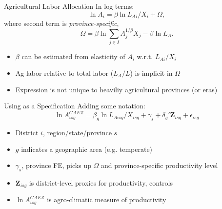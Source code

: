 \documentclass[10pt, xcolor=dvipsnames]{beamer}
\begin{document}
\begin{frame}{Agricultural Labor Allocation}
In log terms:
\begin{equation}
\ln A_{i} = \beta \ln L_{Ai}/X_i + \Omega, \label{EQ_est}
\end{equation}
where second term is \textit{province-specific},
\begin{equation}
   \Omega = \beta \ln \sum_{j\in I} A_{j}^{1/\beta}X_{j} - \beta \ln L_A.
\end{equation} 

\begin{itemize}
  \item $\beta$ can be estimated from elasticity of $A_i$ w.r.t. $L_{Ai}/X_i$
  \item Ag labor relative to total labor ($L_A/L$) is implicit in $\Omega$
  \item Expression is not unique to heaviliy agricultural provinces (or eras)
\end{itemize}

\hfill \hyperlink{extend}{}
\end{frame}

\begin{frame}{Using as a Specification}
Adding some notation:
\begin{equation}
\ln A^{GAEZ}_{isg} = \beta_g \ln L_{Aisg}/X_{isg} + \gamma_{s} + \delta_g' \mathbf{Z}_{isg} + \epsilon_{isg}
\end{equation}

\begin{itemize}
  \item District $i$, region/state/province $s$
  \item $g$ indicates a geographic area (e.g. temperate)
  \item $\gamma_{s}$, province FE, picks up $\Omega$ and province-specific productivity level
  \item $\mathbf{Z}_{isg}$ is district-level proxies for productivity, controls
  \item $\ln A^{GAEZ}_{isg}$ is agro-climatic measure of productivity
\end{itemize}
\end{frame}
\end{document}
